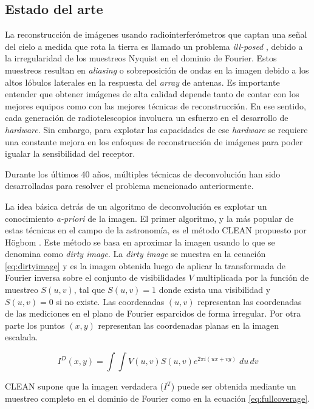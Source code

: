 \subsection{Estado del arte}
\label{sec:estadodelarte}


La reconstrucción de imágenes usando radiointerferómetros que captan una señal del cielo a medida que rota la tierra es llamado un problema \textit{ill-posed} \citep{chen}, debido a la irregularidad de los muestreos Nyquist en el dominio de Fourier. Estos muestreos resultan en \textit{aliasing} o sobreposición de ondas en la imagen debido a los altos lóbulos laterales en la respuesta del \textit{array} de antenas. Es importante entender que obtener imágenes de alta calidad depende tanto de contar con los mejores equipos como con las mejores técnicas de reconstrucción. En ese sentido, cada generación de radiotelescopios involucra un esfuerzo en el desarrollo de \textit{hardware}. Sin embargo, para explotar las capacidades de ese \textit{hardware} se requiere una constante mejora en los enfoques de reconstrucción de imágenes para poder igualar la sensibilidad del receptor.

Durante los últimos 40 años, múltiples técnicas de deconvolución han sido desarrolladas para resolver el problema mencionado anteriormente. 

La idea básica detrás de un algoritmo de deconvolución es explotar un conocimiento \textit{a-priori} de la imagen. El primer algoritmo, y la más popular de estas técnicas en el campo de la astronomía, es el método CLEAN propuesto por Högbom \citep{CLEAN}. Este método se basa en aproximar la imagen usando lo que se denomina como \textit{dirty image}. La \textit{dirty image} se muestra en la ecuación \ref{eq:dirtyimage} y es la imagen obtenida luego de aplicar la transformada de Fourier inversa sobre el conjunto de visibilidades $V$ multiplicada por la función de muestreo $S(u,v)$, tal que $S(u,v)=1$ donde exista una visibilidad y $S(u,v)=0$ si no existe. Las coordenadas $(u,v)$ representan las coordenadas de las mediciones en el plano de Fourier esparcidos de forma irregular. Por otra parte los puntos $(x,y)$ representan las coordenadas planas en la imagen escalada. 

\begin{equation}
I^{D}(x,y) = \int\int V(u,v)S(u,v)e^{2\pi i(ux+vy)}\;du\,dv
\label{eq:dirtyimage}
\end{equation}

CLEAN supone que la imagen verdadera ($I^{T}$) puede ser obtenida mediante un muestreo completo en el dominio de Fourier como en la ecuación \ref{eq:fullcoverage}.


